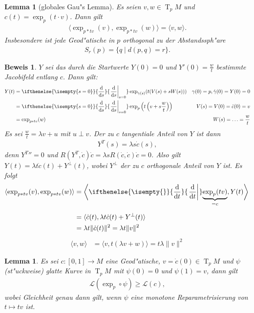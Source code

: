 \documentclass[paper=A4, twoside, chapterprefix=true, bibliography=totoc, headsepline]{scrbook}
\DeclareMathOperator{\T}{T}         %
\newcommand{\dop}{\mathrm{d}}
\newcommand{\difffrac}[3][]{\ifthenelse{\isempty{#1}}{\frac{\dop #2}{\dop #3}}{\left. \frac{\dop #2}{\dop #3} \right|_{#1}}}
\theoremstyle{plain}
\newtheorem{Lemma}[Dfn]{Lemma}
\theoremstyle{nonumberplain}
\newtheorem{bew}{Beweis}
\theoremstyle{empty}
\theoremstyle{break}
\begin{document}
\begin{Lemma}[globales Gau"s Lemma]
  Es seien $v, w \in \T_pM$ und $c(t) = \exp_p(t \cdot v)$.
  Dann gilt
  \begin{align*}
    \langle \exp_{p*tv}(v), \exp_{p*tv}(w) \rangle = \langle v, w \rangle.
  \end{align*}
  Insbesondere ist jede Geod"atische in $p$ orthogonal zu der Abstandssph"are
  \begin{align*}
    S_r(p) = \{ q \mid d(p, q) = r \}.
  \end{align*}
\end{Lemma}

\begin{bew}
  $Y$ sei das durch die Startwerte $Y(0) = 0$ und $Y'(0) = \frac{w}{t}$ bestimmte Jacobifeld entlang $c$.
  Dann gilt:
  \begin{align*}
    Y(t) &= \difffrac[s=0]{}{s} \exp_{\gamma(s)}(t(V(s) + sW(s))) & \gamma(0) = p, \dot\gamma(0) = Y(0) = 0\\
    &= \difffrac[s=0]{}{s} \exp_p\left(t \left(v + s \frac{w}{t}\right)\right) & V(s) = V(0) = \dot c(0) = v\\
    &= \exp_{p*tv}(w) & W(s) = \ldots = \frac{w}{t}
  \end{align*}
  Es sei $\frac{w}{t} = \lambda v + u$ mit $u \perp v$.
  Der zu $c$ tangentiale Anteil von $Y$ ist dann
  \begin{align*}
    Y^T(s) = \lambda s \dot c (s),
  \end{align*}
  denn ${Y^T}{''} = 0$ und $R(Y^T, \dot c) \dot c = \lambda s R(\dot c, \dot c) \dot c = 0$.
  Also gilt $Y(t) = \lambda t \dot c(t) + Y^\perp(t)$, wobei $Y^\perp$ der zu $c$ orthogonale Anteil von $Y$ ist. Es folgt
  \begin{align*}
    \langle \exp_{p*tv}(v), \exp_{p*tv}(w) \rangle &= \left\langle \difffrac{}{t} \smash{\underbrace{\exp_p(tv)}_{=c}}, Y(t) \right\rangle \vphantom{\underbrace{\difffrac{}{}}_{a}} \\
    &= \langle \dot c(t), \lambda t \dot c(t) + Y^\perp(t) \rangle \\
    &= \lambda t \|\dot c(t) \|^2 = \lambda t \|v\|^2 \\
  \end{align*}
  \begin{align*}
    \langle v, w \rangle &= \langle v, t(\lambda v + w) \rangle = t \lambda \|v\|^2
  \end{align*}
\end{bew}

\begin{Lemma}\label{thm:lemma-9-10}
  Es sei $c \colon [0,1] \to M$ eine Geod"atische, $v = \dot c(0) \in \T_{p}M$ und $\psi$ (st"uckweise) glatte Kurve in $\T_pM$ mit $\psi(0) = 0$ und $\psi(1) = v$, dann gilt
  \begin{align*}
    \mathcal L(\exp_p \circ \psi) \geq \mathcal L(c),
  \end{align*}
  wobei Gleichheit genau dann gilt, wenn $\psi$ eine monotone Reparametrisierung von $t \mapsto tv$ ist.
\end{Lemma}
\end{document}
